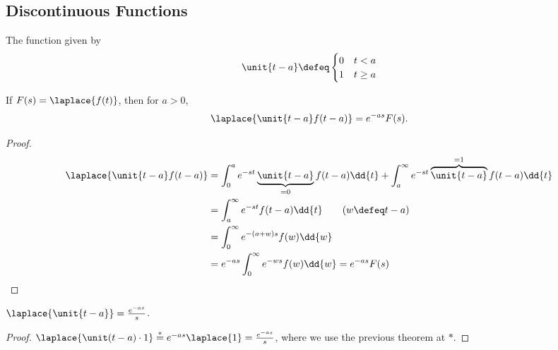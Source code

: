 \subsection{Discontinuous Functions}

\begin{definition}
    The function given by \[
    \unit{t - a} \defeq \begin{cases}
        0 & t < a\\
        1 & t \geq a
    \end{cases}    
    \]
\end{definition}

\begin{theorem}
    If $F(s)  = \laplace{f(t)}$, then for $a > 0$, \[
    \laplace{\unit{t - a} f(t - a)}     = e^{-as} F(s).
    \]
\end{theorem}

\begin{proof}
    \begin{align*}
        \laplace{\unit{t - a} f(t - a)} &= \int_0^a e^{-st} \underbrace{\unit{t - a}}_{=0} f(t - a) \dd{t} + \int_a^\infty e^{-st} \overbrace{\unit{t - a}}^{=1} f(t - a) \dd{t}\\
        &= \int_a^ \infty e^{-st} f(t - a) \dd{t} \qquad (w \defeq t - a)\\
        &= \int_0^\infty e^{-(a + w)s} f(w) \dd{w} \\
        &= e^{-as} \int_0^\infty e^{-w s} f(w) \dd{w} = e^{-as} F(s)
    \end{align*}
\end{proof}

\begin{corollary}
    $\laplace{\unit{t - a}} = \frac{e^{-as}}{s}$.
\end{corollary}

\begin{proof}
    $\laplace{\unit(t - a) \cdot 1} \overset{\ast}{=} e^{-as} \laplace{1} = \frac{e^{-as}}{s}$, where we use the previous theorem at $\ast$.
\end{proof}